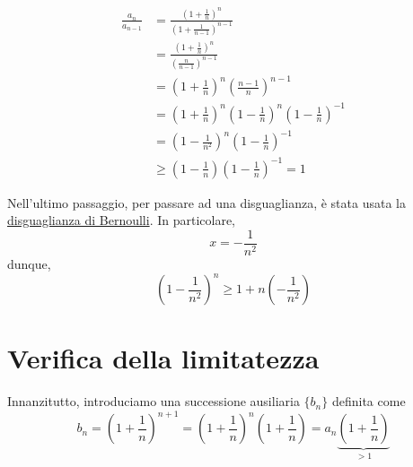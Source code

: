\documentclass[../../analisi1]{subfiles}
\begin{document}
            \medskip
            \begin{minipage}[t]{.6\textwidth}
                \vspace{-\baselineskip}
                
                \begin{align*}
                    \frac{a_n}{a_{n - 1}} &= \frac{{\left(1 + \frac{1}{n}\right)}^n}{{\left(1 + \frac{1}{n - 1}\right)}^{n - 1}}\\
                    &= \frac{{\left(1 + \frac{1}{n}\right)}^n}{{\left(\frac{n}{n - 1}\right)}^{n - 1}}\\
                    &= {\left(1 + \frac{1}{n}\right)}^n {\left(\frac{n - 1}{n}\right)}^{n - 1}\\
                    &= {\left(1 + \frac{1}{n}\right)}^n {\left(1 - \frac{1}{n}\right)}^n {\left(1 - \frac{1}{n}\right)}^{- 1}\\
                    &= {\left(1 - \frac{1}{n^2}\right)}^n {\left(1 - \frac{1}{n}\right)}^{- 1}\\
                    &\geqslant \left(1 - \frac{1}{n}\right) {\left(1 - \frac{1}{n}\right)}^{-1} = 1
                \end{align*}
            \end{minipage}
            \hfill
            \begin{minipage}[t]{.4\textwidth}
                \vspace{-\baselineskip}
                \vspace{7ex}

                \begin{framed}
                    Nell'ultimo passaggio, per passare ad una disguaglianza, è stata usata la
                    \hyperref[disBernoulli]{disguaglianza di Bernoulli}.
                    In particolare,
                    \[
                        x = -\frac{1}{n^2}
                    \]
                    dunque,
                    \[
                        {\left(1 - \frac{1}{n^2}\right)}^n \geqslant 1 + n \left(- \frac{1}{n^2}\right)
                    \]
                \end{framed}
            \end{minipage}

        \section*{Verifica della limitatezza}

            Innanzitutto, introduciamo una successione ausiliaria \(\{b_n\}\) definita come
            \[
                b_n = {\left(1 + \frac{1}{n}\right)}^{n + 1} = {\left(1 + \frac{1}{n}\right)}^n \left(1 + \frac{1}{n}\right) = a_n \underbrace{\left(1 + \frac{1}{n}\right)}_{> 1}
            \]
            
\end{document}

